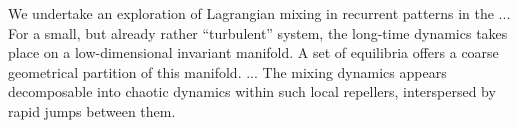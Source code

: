 

We undertake an exploration of Lagrangian mixing in
recurrent patterns in the
...
For a small, but already rather ``turbulent'' system,
the long-time dynamics takes place on a low-dimensional
invariant manifold. A set of equilibria offers a coarse
geometrical partition of this manifold.
...
 The mixing
dynamics appears decomposable into chaotic dynamics within such
local repellers, interspersed by rapid jumps between them.


